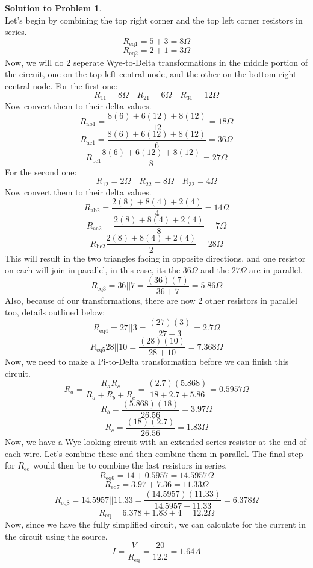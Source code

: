 \documentclass[11pt,letterpaper]{article}
\theoremstyle{definition}
\newtheorem{solprob}{\textcolor{solproblemcolor}{Solution to Problem}}  %
\begin{document}
\begin{solprob} \text{}\\
    Let's begin by combining the top right corner and the top left corner resistors in series.
    \[R_\text{eq1} = 5 + 3 = 8\Omega\]
    \[R_\text{eq2} = 2+1 = 3\Omega\]
    Now, we will do 2 seperate Wye-to-Delta transformations in the middle portion of the circuit, one on the top left central node, and the other on the bottom right central node.
    For the first one:
    \[R_11 = 8\Omega \,\,\,\,\,\, R_21 = 6\Omega\,\,\,\,\,\, R_31 = 12\Omega\]
    Now convert them to their delta values.
    \[R_\text{ab1} = \frac{8(6) + 6(12) + 8(12)}{12} = 18\Omega\]
    \[R_\text{ac1} = \frac{8(6) + 6(12) + 8(12)}{6} = 36\Omega\]
    \[R_\text{bc1} \frac{8(6) + 6(12) + 8(12)}{8} = 27\Omega\]
    For the second one:
    \[R_12 = 2\Omega \,\,\,\,\,\, R_22 = 8\Omega\,\,\,\,\,\, R_32 = 4\Omega\]
    Now convert them to their delta values.
    \[R_\text{ab2} = \frac{2(8) + 8(4) + 2(4)}{4} = 14\Omega\]
    \[R_\text{ac2} = \frac{2(8) + 8(4) + 2(4)}{8} = 7\Omega\]
    \[R_\text{bc2} \frac{2(8) + 8(4) + 2(4)}{2} = 28\Omega\]
    This will result in the two triangles facing in opposite directions, and one resistor on each will join in parallel, in this case, its the $36\Omega$ and the $27\Omega$ are in parallel.
    \[R_\text{eq3} = 36||7 = \frac{(36)(7)}{36+7} = 5.86\Omega\]
    Also, because of our transformations, there are now 2 other resistors in parallel too, details outlined below:
    \[R_\text{eq4} = 27||3 = \frac{(27)(3)}{27+3} = 2.7\Omega\]
    \[R_\text{eq5} 28||10 = \frac{(28)(10)}{28+10} = 7.368\Omega\]
    Now, we need to make a Pi-to-Delta transformation before we can finish this circuit.
    \[R_a = \frac{R_aR_c}{R_a+R_b+R_c} = \frac{(2.7)(5.868)}{18+2.7+5.86} = 0.5957\Omega\]
    \[R_b = \frac{(5.868)(18)}{26.56} = 3.97\Omega\]
    \[R_c = \frac{(18)(2.7)}{26.56} = 1.83\Omega\]
    Now, we have a Wye-looking circuit with an extended series resistor at the end of each wire. Let's combine these and then combine them in parallel.  The final step for $R_\text{eq}$ would then be to combine the last resistors in series.
    \[R_\text{eq6} = 14+0.5957 = 14.5957\Omega\]
    \[R_\text{eq7} = 3.97 + 7.36 = 11.33\Omega\]
    \[R_\text{eq8} = 14.5957||11.33 = \frac{(14.5957)(11.33)}{14.5957 + 11.33} = 6.378\Omega\]
    \[R_\text{eq} = 6.378 + 1.83 + 4 = 12.2\Omega\]
    Now, since we have the fully simplified circuit, we can calculate for the current in the circuit using the source.
    \[I = \frac{V}{R_\text{eq}} = \frac{20}{12.2} = 1.64 A\]
\end{solprob}
\end{document}
